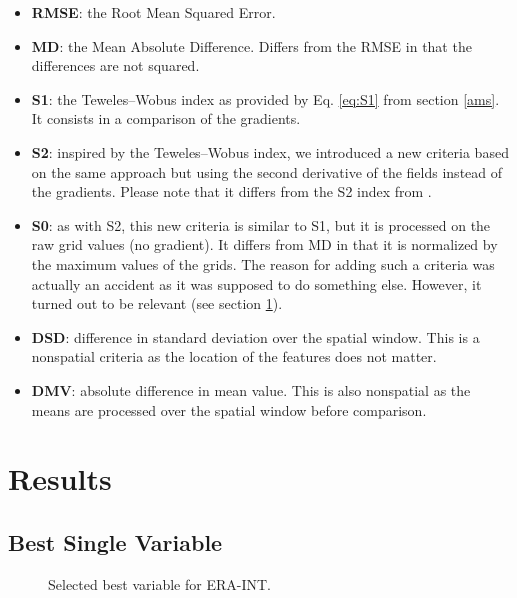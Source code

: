 \documentclass[draft]{agujournal2019}
\begin{document}
\begin{itemize}
	\item \textbf{RMSE}: the Root Mean Squared Error.
	\item \textbf{MD}: the Mean Absolute Difference. Differs from the RMSE in that the differences are not squared.
	\item \textbf{S1}: the Teweles--Wobus index as provided by Eq. \ref{eq:S1} from section \ref{ams}. It consists in a comparison of the gradients. 
	\item \textbf{S2}: inspired by the Teweles--Wobus index, we introduced a new criteria based on the same approach but using the second derivative of the fields instead of the gradients. Please note that it differs from the S2 index from .
	\item \textbf{S0}: as with S2, this new criteria is similar to S1, but it is processed on the raw grid values (no gradient). It differs from MD in that it is normalized by the maximum values of the grids. The reason for adding such a criteria was actually an accident as it was supposed to do something else. However, it turned out to be relevant (see section \ref{results}).
	\item \textbf{DSD}: difference in standard deviation over the spatial window. This is a nonspatial criteria as the location of the features does not matter.
	\item \textbf{DMV}: absolute difference in mean value. This is also nonspatial as the means are processed over the spatial window before comparison.
\end{itemize}



\section{Results}
\label{results}

\subsection{Best Single Variable}
\label{best_single}



\begin{figure}[h]
	\noindent{}
	\caption{Selected best variable for ERA-INT.}
	\label{fig_best_era_int}
\end{figure}
\end{document}
